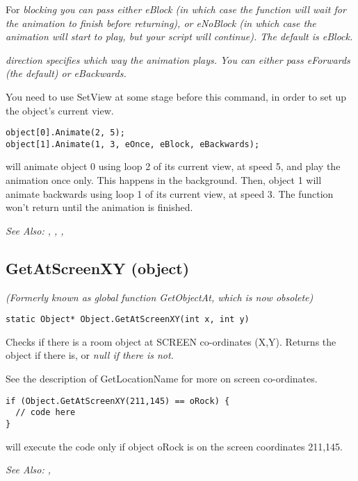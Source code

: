 For \it{blocking} you can pass either eBlock (in which case the function will wait
for the animation to finish before returning), or eNoBlock (in which case the animation
will start to play, but your script will continue). The default is eBlock.

\it{direction} specifies which way the animation plays. You can either pass eForwards (the
default) or eBackwards.

You need to use SetView at some stage before this command, in order to set up the object's
current view.

\begin{verbatim}
object[0].Animate(2, 5);
object[1].Animate(1, 3, eOnce, eBlock, eBackwards);
\end{verbatim}
will animate object 0 using loop 2 of its current view, at speed 5, and play the
animation once only. This happens in the background.
Then, object 1 will animate backwards using loop 1 of its current view, at speed 3. The
function won't return until the animation is finished.

\it{See Also:} ,
, ,


\subsection{GetAtScreenXY (object)}\label{Object.GetAtScreenXY}%

\it{(Formerly known as global function GetObjectAt, which is now obsolete)}

\begin{verbatim}
static Object* Object.GetAtScreenXY(int x, int y)
\end{verbatim}
Checks if there is a room object at SCREEN co-ordinates (X,Y).
Returns the object if there is, or \it{null} if there is not.

See the description of GetLocationName for more on screen co-ordinates.

\begin{verbatim}
if (Object.GetAtScreenXY(211,145) == oRock) {
  // code here
}
\end{verbatim}
will execute the code only if object oRock is on the screen coordinates 211,145.

\it{See Also:} ,


